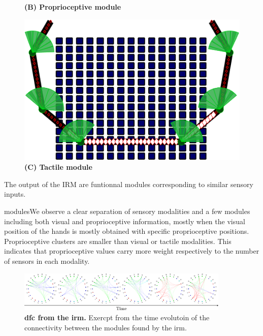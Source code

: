 \begin{figure}[h!]
\begin{minipage}{0.32\textwidth}
        \textbf{(B) Proprioceptive module}
    \end{minipage}
    \hfill
    \begin{minipage}{0.32\textwidth}
        \centering
        \includegraphics[width=\linewidth]{modules_repr_t.png}
        \textbf{(C) Tactile module}
    \end{minipage}
    
\end{figure}
The output of the IRM are funtionnal modules corresponding to similar sensory inputs.

modulesWe observe a clear separation of sensory modalities and a few modules including both visual and proprioceptive information, mostly when the visual position of the hands is mostly obtained with specific proprioceptive positions. Proprioceptive clusters are smaller than visual or tactile modalities. This indicates that proprioceptive values carry more weight respectively to the number of sensors in each modality.
\begin{figure}[t!]
	\begin{center}
		\hspace*{\fill}
		\includegraphics[width=0.9\textwidth]{fig/example_dfc.png}
		\hspace*{\fill}
	\end{center}
	\caption{\textbf{\Acl{dfc} from the \ac{irm}.} Exercpt from the time evolutoin of the connectivity between the modules found by the \acl{irm}.}
\end{figure}

